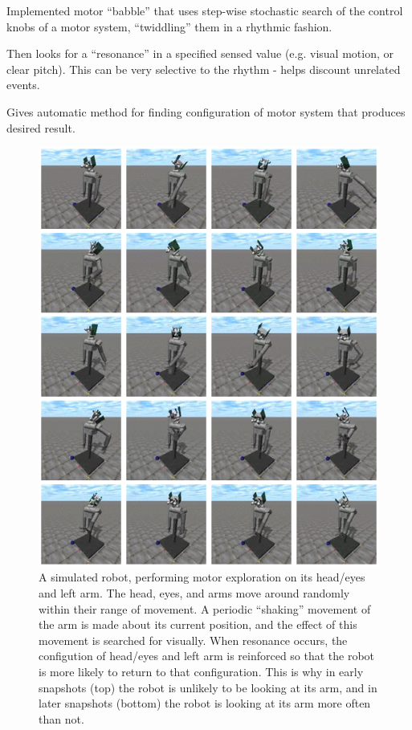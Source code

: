 Implemented motor ``babble'' that uses step-wise stochastic search of
the control knobs of a motor system, ``twiddling'' them in a rhythmic
fashion.

Then looks for a ``resonance'' in a specified sensed value
(e.g. visual motion, or clear pitch).  This can be very selective to
the rhythm - helps discount unrelated events.

Gives automatic method for finding configuration of motor system that
produces desired result.


\begin{figure}[p]
\centerline{\includegraphics[width=\textwidth]{images/find-arm}}
\caption{
%
A simulated robot, performing motor exploration on its
head/eyes and left arm.  The head, eyes, and arms move around randomly
within their range of movement.
%
A periodic ``shaking'' movement of the arm is made about its
current position, and the effect of this movement is searched 
for visually.
%
When resonance occurs, the configution of head/eyes and left arm
is reinforced so that the robot is more likely to return to that
configuration.
%
This is why 
in early snapshots (top) the robot is unlikely to be looking at 
its arm, and in later snapshots (bottom) the robot is looking at
its arm more often than not.
%
}
\end{figure}

